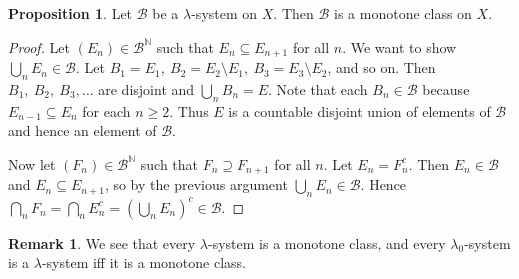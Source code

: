 \documentclass{article}
\newcommand{\N}{\mathbb{N}}
\theoremstyle{definition}
\newtheorem{proposition}[theorem]{Proposition}
\newtheorem*{remark}{Remark}
\begin{document}
\begin{proposition}
    Let $\mathscr{B}$ be a $\lambda$-system on $X$. Then $\mathscr{B}$ is a monotone class on $X$.
\end{proposition}
\begin{proof}
    Let $(E_n) \in \mathscr{B}^{\N}$ such that $E_n \subseteq E_{n+1}$ for all $n$. We want to show $\bigcup_n E_n \in \mathscr{B}$. Let $B_1 = E_1,\ B_2 = E_2 \setminus E_1,\ B_3 = E_3 \setminus E_2$, and so on. Then $B_1,\ B_2,\ B_3,\dots$ are disjoint and $\bigcup_n B_n = E$. Note that each $B_n \in \mathscr{B}$ because $E_{n-1} \subseteq E_n$ for each $n \geq 2$. Thus $E$ is a countable disjoint union of elements of $\mathscr{B}$ and hence an element of $\mathscr{B}$.
    
    Now let $(F_n) \in \mathscr{B}^{\N}$ such that $F_n \supseteq F_{n+1}$ for all $n$. Let $E_n = F_n^c$. Then $E_n \in \mathscr{B}$ and $E_n \subseteq E_{n+1}$, so by the previous argument $\bigcup_n E_n \in \mathscr{B}$. Hence $\bigcap_n F_n = \bigcap_n E_n^c = \left( \bigcup_{n} E_n \right)^c \in \mathscr{B}$.
\end{proof}

\begin{remark}
    We see that every $\lambda$-system is a monotone class, and every $\lambda_0$-system is a $\lambda$-system iff it is a monotone class.
\end{remark}
\end{document}

